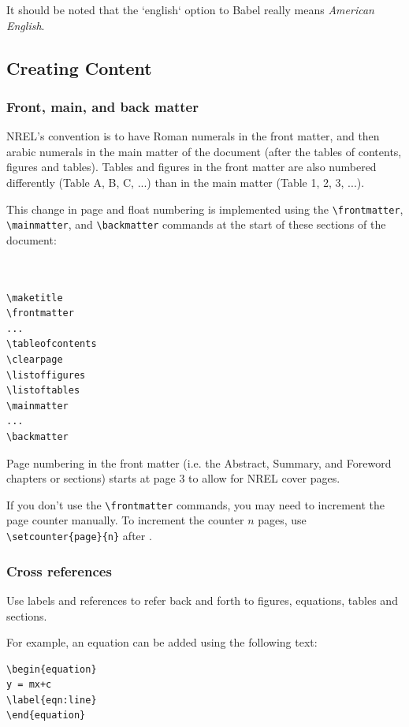 It should be noted that the `english` option to Babel really means \emph{American English}.

\subsection{Creating Content}
\subsubsection{Front, main, and back matter}
NREL's convention is to have Roman numerals in the front matter, and then arabic numerals in the main matter of the document (after the tables of contents, figures and tables). Tables and figures in the front matter are also numbered differently (Table A, B, C, ...) than in the main matter (Table 1, 2, 3, ...).

This change in page and float numbering is implemented using the \verb+\frontmatter+, \verb+\mainmatter+, and \verb+\backmatter+ commands at the start of these sections of the document:

\begin{lstlisting}


\maketitle
\frontmatter
...
\tableofcontents
\clearpage
\listoffigures
\listoftables
\mainmatter
...
\backmatter

\end{lstlisting}

Page numbering in the front matter (i.e. the Abstract, Summary, and Foreword chapters or sections) starts at page 3 to allow for NREL cover pages.

If you don't use the \verb+\frontmatter+ commands, you may need to increment the page counter manually. To increment the counter $n$ pages, use \verb+\setcounter{page}{n}+ after \verb++.

\subsubsection{Cross references}
Use labels and references to refer back and forth to figures, equations, tables and sections. 

For example, an equation can be added using the following text:

\begin{lstlisting}
\begin{equation}
y = mx+c
\label{eqn:line}
\end{equation}
\end{lstlisting}

